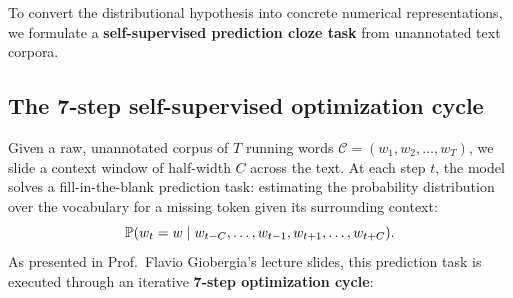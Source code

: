 \documentclass[../../main.tex]{subfiles}
\begin{document}
To convert the distributional hypothesis into concrete numerical representations, we formulate a \textbf{self-supervised prediction cloze task} from unannotated text corpora.

\subsection{The 7-step self-supervised optimization cycle}
\label{subsec:seven_step_loop}

Given a raw, unannotated corpus of $T$ running words $\mathcal{C} = (w_1, w_2, \dots, w_T)$, we slide a context window of half-width $C$ across the text. At each step $t$, the model solves a fill-in-the-blank prediction task: estimating the probability distribution over the vocabulary for a missing token given its surrounding context:
\begin{equation}
\label{eq:cloze_task}
\mathbb{P}(w_t = w \mid w_{t-C}, \dots, w_{t-1}, w_{t+1}, \dots, w_{t+C}).
\end{equation}
As presented in Prof.~Flavio Giobergia's lecture slides, this prediction task is executed through an iterative \textbf{7-step optimization cycle}:
\end{document}
